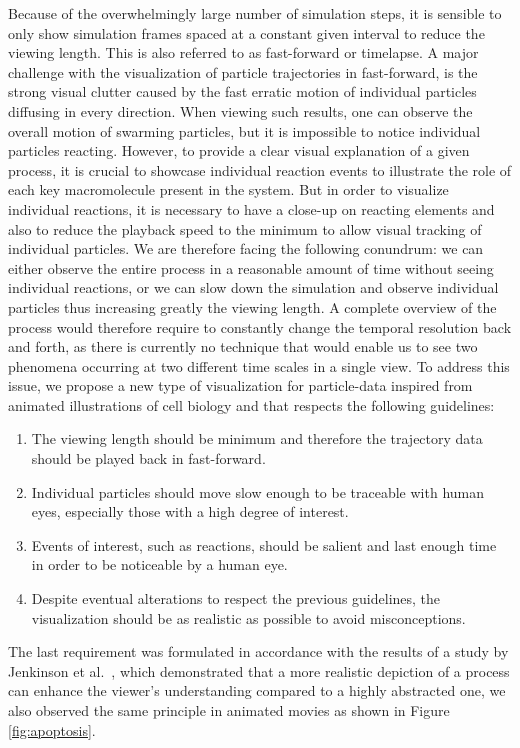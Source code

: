 Because of the overwhelmingly large number of simulation steps, it is sensible to only show simulation frames spaced at a constant given interval to reduce the viewing length. This is also referred to as fast-forward or timelapse.
A major challenge with the visualization of particle trajectories in fast-forward, is the strong visual clutter caused by the fast erratic motion of individual particles diffusing in every direction.
When viewing such results, one can observe the overall motion of swarming particles, but it is impossible to notice individual particles reacting.
However, to provide a clear visual explanation of a given process, it is crucial to showcase individual reaction events to illustrate the role of each key macromolecule present in the system.
But in order to visualize individual reactions, it is necessary to have a close-up on reacting elements and also to reduce the playback speed to the minimum to allow visual tracking of individual particles.
We are therefore facing the following conundrum: we can either observe the entire process in a reasonable amount of time without seeing individual reactions, or we can slow down the simulation and observe individual particles thus increasing greatly the viewing length.
A complete overview of the process would therefore require to constantly change the temporal resolution back and forth, as there is currently no technique that would enable us to see two phenomena occurring at two different time scales in a single view.
To address this issue, we propose a new type of visualization for particle-data inspired from animated illustrations of cell biology and that respects the following guidelines:
\begin{enumerate}
	\item The viewing length should be minimum and therefore the trajectory data should be played back in fast-forward.	
	\item Individual particles should move slow enough to be traceable with human eyes, especially those with a high degree of interest.	
	\item Events of interest, such as reactions, should be salient and last enough time in order to be noticeable by a human eye.	
	\item Despite eventual alterations to respect the previous guidelines, the visualization should be as realistic as possible to avoid misconceptions.
\end{enumerate}
The last requirement was formulated in accordance with the results of a study by Jenkinson et al.~\cite{jenkinson2012visualizing}, which demonstrated that a more realistic depiction of a process can enhance the viewer’s understanding compared to a highly abstracted one, we also observed the same principle in animated movies as shown in Figure \ref{fig:apoptosis}.


